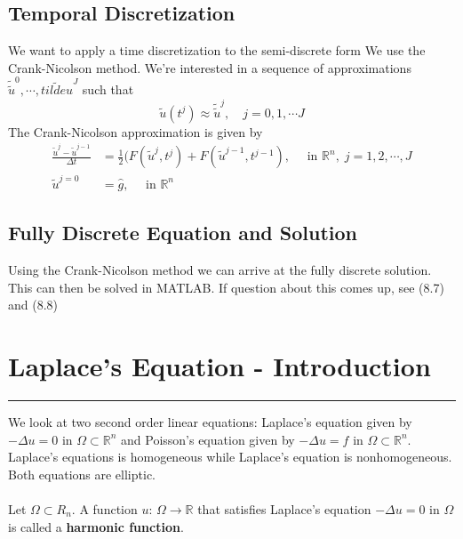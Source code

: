 \documentclass[11pt]{article}
\newcommand{\R}{\mathbb{R}}
\begin{document}
\subsection{Temporal Discretization}
We want to apply a time discretization to the semi-discrete form We use the Crank-Nicolson method. We're interested in a sequence of approximations $\tilde{\tilde{u}}^0, \cdots, \tilde{tilde{u}}^J$ such that
$$ \tilde{u}(t^j) \approx \tilde{\tilde{u}}^j, \quad j=0,1,\cdots J$$
The Crank-Nicolson approximation is given by
\begin{align*}
\frac{\tilde{u}^{j}-\tilde{u}^{j-1}}{\Delta t} &= \frac{1}{2} (F(\tilde{u}^j, t^j) + F(\tilde{u}^{j-1}, t^{j-1}), \quad \text{ in } \R^n, \; j =1,2,\cdots, J\\
\tilde{u}^{j=0} &= \hat{g}, \quad \text{ in } \R^n
\end{align*}

\subsection{Fully Discrete Equation and Solution}
Using the Crank-Nicolson method we can arrive at the fully discrete solution. This can then be solved in MATLAB. If question about this comes up, see (8.7) and (8.8)

\pagebreak

\section{Laplace's Equation - Introduction}
\hrule \vspace{15pt}

We look at two second order linear equations:  Laplace's equation given by $-\Delta u = 0$ in $\Omega \subset \R^n$ and Poisson's equation given by $-\Delta u = f$ in $\Omega \subset \R^n$. Laplace's equations is homogeneous while Laplace's equation is nonhomogeneous. Both equations are elliptic. \\ \\ 
Let $\Omega \subset R_n$.  A function $u$: $\Omega \rightarrow \R$ that satisfies Laplace’s equation $-\Delta u = 0$ in $\Omega$ is called a \textbf{harmonic function}.
\end{document}
